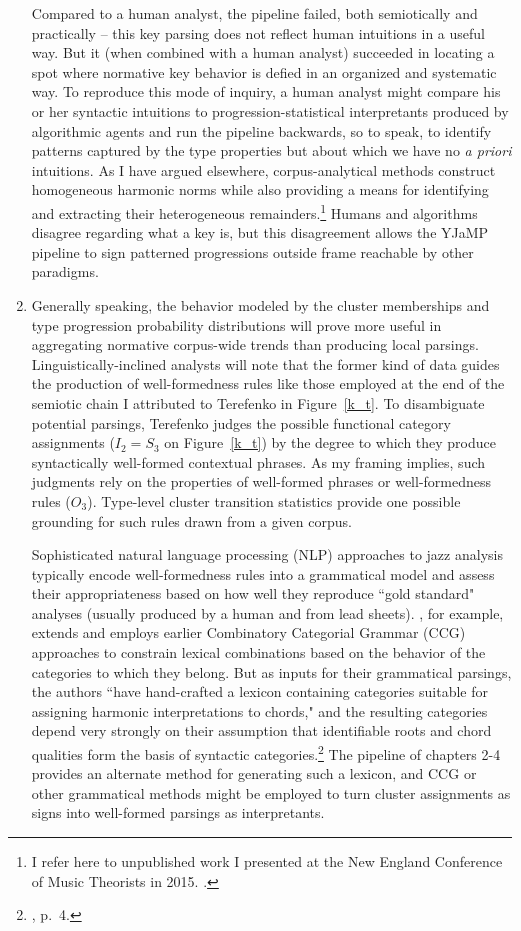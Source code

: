 \begin{enumerate}
Compared to a human analyst, the pipeline failed, both semiotically and practically -- this key parsing does not reflect human intuitions in a useful way.  But it (when combined with a human analyst) succeeded in locating a spot where normative key behavior is defied in an organized and systematic way.  To reproduce this mode of inquiry, a human analyst might compare his or her syntactic intuitions to progression-statistical interpretants produced by algorithmic agents and run the pipeline backwards, so to speak, to identify patterns captured by the type properties but about which we have no \emph{a priori} intuitions.  As I have argued elsewhere, corpus-analytical methods construct homogeneous harmonic norms while also providing a means for identifying and extracting their heterogeneous remainders.\footnote{I refer here to unpublished work I presented at the New England Conference of Music Theorists in 2015.  \cite{jones2015}.}  Humans and algorithms disagree regarding what a key is, but this disagreement allows the YJaMP pipeline to sign patterned progressions outside frame reachable by other paradigms.

	\item Generally speaking, the behavior modeled by the cluster memberships and type progression probability distributions will prove more useful in aggregating normative corpus-wide trends than producing local parsings.  Linguistically-inclined analysts will note that the former kind of data guides the production of well-formedness rules like those employed at the end of the semiotic chain I attributed to Terefenko in Figure~\ref{k_t}.  To disambiguate potential parsings, Terefenko judges the possible functional category assignments ($I_2 = S_3$ on Figure~\ref{k_t}) by the degree to which they produce syntactically well-formed contextual phrases.  As my framing implies, such judgments rely on the properties of well-formed phrases or well-formedness rules ($O_3$).  Type-level cluster transition statistics provide one possible grounding for such rules drawn from a given corpus.
	
Sophisticated natural language processing (NLP) approaches to jazz analysis typically encode well-formedness rules into a grammatical model and assess their appropriateness based on how well they reproduce ``gold standard" analyses (usually produced by a human and from lead sheets).  \cite{granroth2012}, for example, extends and employs earlier Combinatory Categorial Grammar (CCG) approaches to constrain lexical combinations based on the behavior of the categories to which they belong.  But as inputs for their grammatical parsings, the authors ``have hand-crafted a lexicon containing categories suitable for assigning harmonic interpretations to chords," and the resulting categories depend very strongly on their assumption that identifiable roots and chord qualities form the basis of syntactic categories.\footnote{\cite{granroth2012}, p.\ 4.}  The pipeline of chapters 2-4 provides an alternate method for generating such a lexicon, and CCG or other grammatical methods might be employed to turn cluster assignments as signs into well-formed parsings as interpretants.


\end{enumerate}
